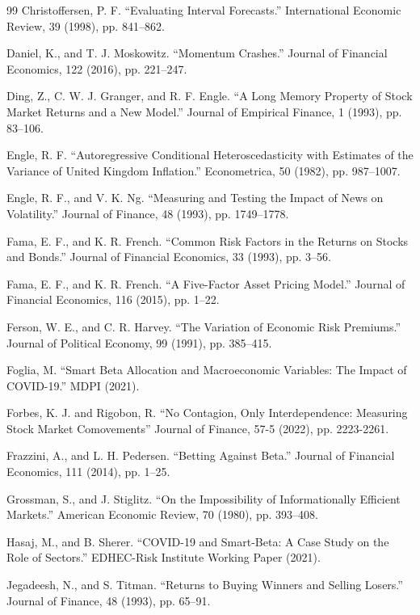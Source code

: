 \documentclass{article}
\begin{document}
\begin{thebibliography}{99}
 Christoffersen, P. F. “Evaluating Interval Forecasts.” International Economic Review, 39 (1998), pp. 841–862.

 Daniel, K., and T. J. Moskowitz. “Momentum Crashes.” Journal of Financial Economics, 122 (2016), pp. 221–247.

 Ding, Z., C. W. J. Granger, and R. F. Engle. “A Long Memory Property of Stock Market Returns and a New Model.” Journal of Empirical Finance, 1 (1993), pp. 83–106.

 Engle, R. F. “Autoregressive Conditional Heteroscedasticity with Estimates of the Variance of United Kingdom Inflation.” Econometrica, 50 (1982), pp. 987–1007.

 Engle, R. F., and V. K. Ng. “Measuring and Testing the Impact of News on Volatility.” Journal of Finance, 48 (1993), pp. 1749–1778.

 Fama, E. F., and K. R. French. “Common Risk Factors in the Returns on Stocks and Bonds.” Journal of Financial Economics, 33 (1993), pp. 3–56.

 Fama, E. F., and K. R. French. “A Five-Factor Asset Pricing Model.” Journal of Financial Economics, 116 (2015), pp. 1–22.

 Ferson, W. E., and C. R. Harvey. “The Variation of Economic Risk Premiums.” Journal of Political Economy, 99 (1991), pp. 385–415.

 Foglia, M. “Smart Beta Allocation and Macroeconomic Variables: The Impact of COVID-19.” MDPI (2021).

 Forbes, K. J. and Rigobon, R. “No Contagion, Only Interdependence: Measuring Stock Market Comovements” Journal of Finance, 57-5 (2022), pp. 2223-2261.

 Frazzini, A., and L. H. Pedersen. “Betting Against Beta.” Journal of Financial Economics, 111 (2014), pp. 1–25.

 Grossman, S., and J. Stiglitz. “On the Impossibility of Informationally Efficient Markets.” American Economic Review, 70 (1980), pp. 393–408.

 Hasaj, M., and B. Sherer. “COVID-19 and Smart-Beta: A Case Study on the Role of Sectors.” EDHEC-Risk Institute Working Paper (2021).

 Jegadeesh, N., and S. Titman. “Returns to Buying Winners and Selling Losers.” Journal of Finance, 48 (1993), pp. 65–91.


\end{thebibliography}
\end{document}
